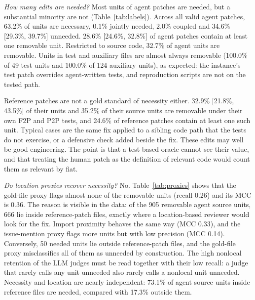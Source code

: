 \documentclass[a4paper,fleqn]{cas-sc}
\newcommand{\rqtwoAgentAuxUnits}{124}
\newcommand{\rqtwoAgentAuxUnneeded}{100.0\%}
\newcommand{\rqtwoAgentPatchesUnneeded}{28.6\%}
\newcommand{\rqtwoAgentPatchesUnneededCI}{[24.6\%, 32.8\%]}
\newcommand{\rqtwoAgentShareC}{2.0\%}
\newcommand{\rqtwoAgentShareJ}{0.1\%}
\newcommand{\rqtwoAgentShareN}{63.2\%}
\newcommand{\rqtwoAgentShareU}{34.6\%}
\newcommand{\rqtwoAgentShareUCI}{[29.3\%, 39.7\%]}
\newcommand{\rqtwoAgentSrcUnneeded}{32.7\%}
\newcommand{\rqtwoAgentTestUnits}{49}
\newcommand{\rqtwoAgentTestUnneeded}{100.0\%}
\newcommand{\rqtwoGoldPatchesUnneeded}{24.6\%}
\newcommand{\rqtwoGoldShareU}{32.9\%}
\newcommand{\rqtwoGoldShareUCI}{[21.8\%, 43.5\%]}
\newcommand{\rqtwoGoldSrcUnneeded}{35.2\%}
\newcommand{\rqtwoLocalNeededShare}{73.1\%}
\newcommand{\rqtwoMccPdep}{0.33}
\newcommand{\rqtwoMccPgoldfile}{0.36}
\newcommand{\rqtwoMccPissue}{0.14}
\newcommand{\rqtwoNonlocalNeeded}{50}
\newcommand{\rqtwoNonlocalNeededShare}{17.3\%}
\newcommand{\rqtwoRecPgoldfile}{0.26}
\newcommand{\rqtwoSrcUnneededN}{905}
\newcommand{\rqtwoUnneededInGold}{666}
\begin{document}
\emph{How many edits are needed?} Most units of agent patches are needed, but a substantial minority are not (Table~\ref{tab:labels}). Across all valid agent patches, \rqtwoAgentShareN{} of units are necessary, \rqtwoAgentShareJ{} jointly needed, \rqtwoAgentShareC{} coupled and \rqtwoAgentShareU{} \rqtwoAgentShareUCI{} unneeded. \rqtwoAgentPatchesUnneeded{} \rqtwoAgentPatchesUnneededCI{} of agent patches contain at least one removable unit. Restricted to source code, \rqtwoAgentSrcUnneeded{} of agent units are removable. Units in test and auxiliary files are almost always removable (\rqtwoAgentTestUnneeded{} of \rqtwoAgentTestUnits{} test units and \rqtwoAgentAuxUnneeded{} of \rqtwoAgentAuxUnits{} auxiliary units), as expected: the instance's test patch overrides agent-written tests, and reproduction scripts are not on the tested path.

Reference patches are not a gold standard of necessity either. \rqtwoGoldShareU{} \rqtwoGoldShareUCI{} of their units and \rqtwoGoldSrcUnneeded{} of their source units are removable under their own F2P and P2P tests, and \rqtwoGoldPatchesUnneeded{} of reference patches contain at least one such unit. Typical cases are the same fix applied to a sibling code path that the tests do not exercise, or a defensive check added beside the fix. These edits may well be good engineering. The point is that a test-based oracle cannot see their value, and that treating the human patch as the definition of relevant code would count them as relevant by fiat.

\emph{Do location proxies recover necessity?} No. Table~\ref{tab:proxies} shows that the gold-file proxy flags almost none of the removable units (recall \rqtwoRecPgoldfile{}) and its MCC is \rqtwoMccPgoldfile{}. The reason is visible in the data: of the \rqtwoSrcUnneededN{} removable agent source units, \rqtwoUnneededInGold{} lie inside reference-patch files, exactly where a location-based reviewer would look for the fix. Import proximity behaves the same way (MCC \rqtwoMccPdep{}), and the issue-mention proxy flags more units but with low precision (MCC \rqtwoMccPissue{}). Conversely, \rqtwoNonlocalNeeded{} needed units lie outside reference-patch files, and the gold-file proxy misclassifies all of them as unneeded by construction. The high nonlocal retention of the LLM judges must be read together with their low recall: a judge that rarely calls any unit unneeded also rarely calls a nonlocal unit unneeded. Necessity and location are nearly independent: \rqtwoLocalNeededShare{} of agent source units inside reference files are needed, compared with \rqtwoNonlocalNeededShare{} outside them.
\end{document}
